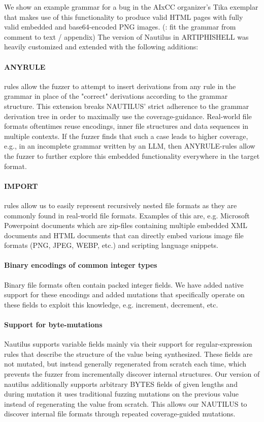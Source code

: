 We show an example grammar for a bug in the AIxCC organizer's Tika exemplar that makes use of this functionality to produce valid HTML pages with fully valid embedded and base64-encoded PNG images. (\TBD: fit the grammar from comment to text / appendix)
%
%
The version of Nautilus in ARTIPHISHELL was heavily customized and extended with the following additions:

\paragraph{ANYRULE} rules allow the fuzzer to attempt to insert derivations from any rule in the grammar in place of the "correct" derivations according to the grammar structure.
This extension breaks NAUTILUS' strict adherence to the grammar derivation tree in order to maximally use the coverage-guidance.
Real-world file formats oftentimes reuse encodings, inner file structures and data sequences in multiple contexts.
If the fuzzer finds that such a case leads to higher coverage, e.g., in an incomplete grammar written by an LLM, then ANYRULE-rules allow the fuzzer to further explore this embedded functionality everywhere in the target format.

\paragraph{IMPORT} rules allow us to easily represent recursively nested file formats as they are commonly found in real-world file formats.
Examples of this are, e.g. Microsoft Powerpoint documents which are zip-files containing multiple embedded XML documents and HTML documents that can directly embed various image file formats (PNG, JPEG, WEBP, etc.) and scripting language snippets.

\paragraph{Binary encodings of common integer types} Binary file formats often contain packed integer fields.
We have added native support for these encodings and added mutations that specifically operate on these fields to exploit this knowledge, e.g. increment, decrement, etc.

\paragraph{Support for byte-mutations} Nautilus supports variable fields mainly via their support for regular-expression rules that describe the structure of the value being synthesized.
These fields are not mutated, but instead generally regenerated from scratch each time, which prevents the fuzzer from incrementally discover internal structures.
Our version of nautilus additionally supports arbitrary BYTES fields of given lengths and during mutation it uses traditional fuzzing mutations on the previous value instead of regenerating the value from scratch.
This allows our NAUTILUS to discover internal file formats through repeated coverage-guided mutations.

